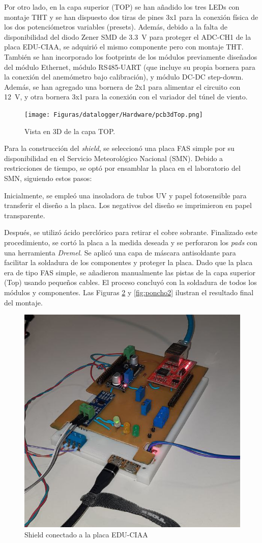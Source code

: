 Por otro lado, en la capa superior (TOP) se han añadido los tres LEDs con montaje THT y se han dispuesto dos tiras de pines 3x1 para la conexión física de los dos potenciómetros variables (presets). Además, debido a la falta de disponibilidad del diodo Zener SMD de \SI{3.3}{\volt} para proteger el ADC-CH1 de la placa EDU-CIAA, se adquirió el mismo componente pero con montaje THT. También se han incorporado los footprints de los módulos previamente diseñados del módulo Ethernet, módulo RS485-UART (que incluye su propia bornera para la conexión del anemómetro bajo calibración), y módulo DC-DC step-dowm. Además, se han agregado una bornera de 2x1 para alimentar el circuito con \SI{12}{\volt}, y otra bornera 3x1 para la conexión con el variador del túnel de viento.


\begin{figure}[H]
    \centering
    \texttt{[image: Figuras/datalogger/Hardware/pcb3dTop.png]}
    \caption{Vista en 3D de la capa TOP.}
    \label{fig:pcb3dTop}
\end{figure}

Para la construcción del \textit{shield}, se seleccionó una placa FAS simple por su disponibilidad en el Servicio Meteorológico Nacional (SMN). Debido a restricciones de tiempo, se optó por ensamblar la placa en el laboratorio del SMN, siguiendo estos pasos:

Inicialmente, se empleó una insoladora de tubos UV y papel fotosensible para transferir el diseño a la placa. Los negativos del diseño se imprimieron en papel transparente.

Después, se utilizó ácido perclórico para retirar el cobre sobrante. Finalizado este procedimiento, se cortó la placa a la medida deseada y se perforaron los \textit{pads} con una herramienta \textit{Dremel}. Se aplicó una capa de máscara antisoldante para facilitar la soldadura de los componentes y proteger la placa. Dado que la placa era de tipo FAS simple, se añadieron manualmente las pistas de la capa superior (Top) usando pequeños cables. El proceso concluyó con la soldadura de todos los módulos y componentes. Las Figuras \ref{fig:poncho1} y \ref{fig:poncho2} ilustran el resultado final del montaje.


\begin{figure}[H]
    \centering
    \includegraphics[width=0.6\linewidth]{Figuras/datalogger/Hardware/poncho1.jpg}
    \caption{Shield conectado a la placa EDU-CIAA}
    \label{fig:poncho1}
\end{figure}



